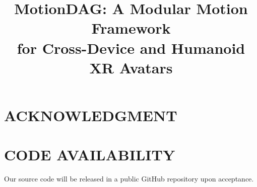 \documentclass{IEEEcsmag}
\begin{document}
\title{MotionDAG: A Modular Motion Framework\\ for Cross-Device and Humanoid XR Avatars}

\author{}
\affil{}

\author{}
\affil{}

\author{}
\affil{}

\author{}
\affil{}


\begin{abstract}

\end{abstract}

\maketitle









\section{ACKNOWLEDGMENT}

\section{CODE AVAILABILITY}
Our source code will be released in a public GitHub repository upon acceptance.



\end{document}
